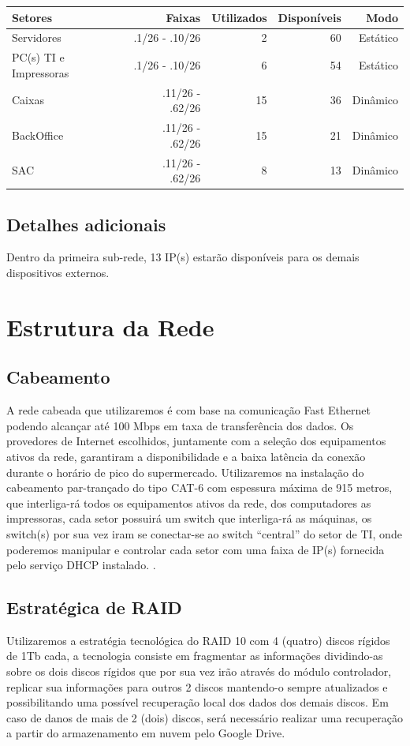\documentclass[12pt]{article}
\begin{document}
\begin{center}
\begin{tabular}{| l | r | r | r | r |}
\hline 
Setores & Faixas & Utilizados & Disponíveis & Modo\\
\hline
Servidores & .1/26 - .10/26 & 2 & 60 & Estático\\
PC(s) TI e Impressoras & .1/26 - .10/26 & 6 & 54 & Estático\\
Caixas & .11/26 - .62/26 & 15 & 36 & Dinâmico\\
BackOffice & .11/26 - .62/26 & 15 & 21 & Dinâmico\\
SAC & .11/26 - .62/26 & 8 & 13 & Dinâmico\\
\hline
\end{tabular}
\end{center}

\subsection{Detalhes adicionais}
Dentro da primeira sub-rede, 13 IP(s) estarão disponíveis para os demais dispositivos externos.

\section{Estrutura da Rede}

\subsection{Cabeamento}
A rede cabeada que utilizaremos é com base na comunicação Fast Ethernet podendo alcançar até 100 Mbps em taxa de transferência dos dados. Os provedores de Internet escolhidos, juntamente com a seleção dos equipamentos ativos da rede, garantiram a disponibilidade e a baixa latência da conexão durante o horário de pico do supermercado. Utilizaremos na instalação do cabeamento par-trançado do tipo CAT-6 com espessura máxima de 915 metros, que interliga-rá todos os equipamentos ativos da rede, dos computadores as impressoras, cada setor possuirá um switch que interliga-rá as máquinas, os switch(s) por sua vez iram se conectar-se ao switch “central” do setor de TI, onde poderemos manipular e controlar cada setor com uma faixa de IP(s) fornecida pelo serviço DHCP instalado.
.
\subsection{Estratégica de RAID}
Utilizaremos a estratégia tecnológica do RAID 10 com 4 (quatro) discos rígidos de 1Tb cada, a tecnologia consiste em fragmentar as informações dividindo-as sobre os dois discos rígidos que por sua vez irão através do módulo controlador, replicar sua informações para outros 2 discos mantendo-o sempre atualizados e possibilitando uma possível recuperação local dos dados dos demais discos. Em caso de danos de mais de 2 (dois) discos, será necessário realizar uma recuperação a partir do armazenamento em nuvem pelo Google Drive.
\end{document}
